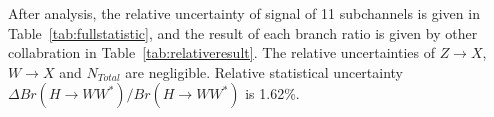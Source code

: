 \documentclass[11pt,a4paper]{cepcnote}
\begin{document}
After analysis, the relative uncertainty of signal of 11 subchannels is given in Table~\ref{tab:fullstatistic}, 
and the result of each branch ratio is given by other collabration in Table~\ref{tab:relativeresult}. 
The relative uncertainties of $Z\rightarrow X$, $W\rightarrow X$ and $N_{Total}$ are negligible. 
Relative statistical uncertainty $\Delta{Br(H\rightarrow WW^*)}/Br(H\rightarrow WW^*)$ is 1.62\%.

%

%
%
%
\end{document}
